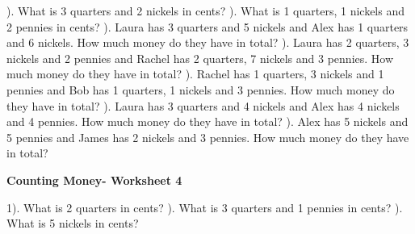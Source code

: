 \documentclass{article}%
\begin{document}
). What is 3 quarters and 2 nickels in cents?%
\newline%
\newline%
). What is 1 quarters, 1 nickels and 2 pennies in cents?%
\newline%
\newline%
). Laura has 3 quarters and 5 nickels and Alex has 1 quarters and 6 nickels. How much money do they have in total?%
\newline%
\newline%
). Laura has 2 quarters, 3 nickels and 2 pennies and Rachel has 2 quarters, 7 nickels and 3 pennies. How much money do they have in total?%
\newline%
\newline%
). Rachel has 1 quarters, 3 nickels and 1 pennies and Bob has 1 quarters, 1 nickels and 3 pennies. How much money do they have in total?%
\newline%
\newline%
). Laura has 3 quarters and 4 nickels and Alex has 4 nickels and 4 pennies. How much money do they have in total?%
\newline%
\newline%
). Alex has 5 nickels and 5 pennies and James has 2 nickels and 3 pennies. How much money do they have in total?%
\newline%
\newline%
\newline%
\pagebreak%
\large%
\begin{center}%
\textbf{Counting Money- Worksheet 4}%
\newline%
\newline%
\newline%
\end{center} \normalsize%
1). What is 2 quarters in cents?%
\newline%
\newline%
). What is 3 quarters and 1 pennies in cents?%
\newline%
\newline%
). What is 5 nickels in cents?%
\newline%
\end{document}
